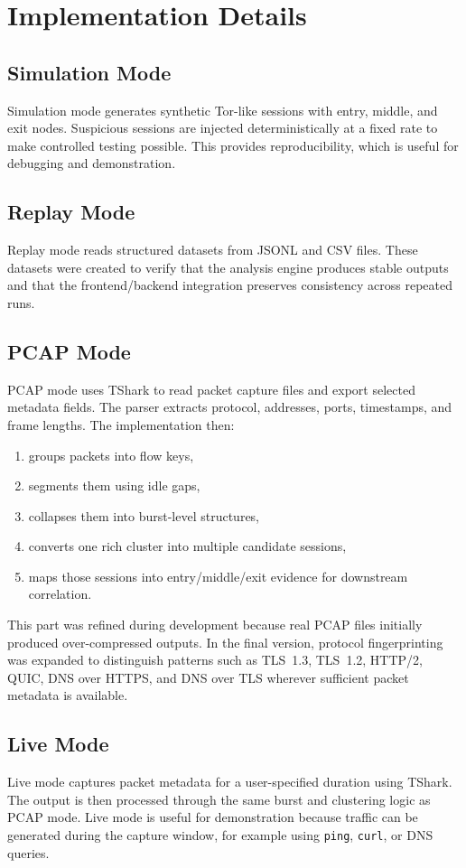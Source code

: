 \documentclass[12pt,a4paper]{report}
\begin{document}
\chapter{Implementation Details}
\section{Simulation Mode}
Simulation mode generates synthetic Tor-like sessions with entry, middle, and exit nodes. Suspicious sessions are injected deterministically at a fixed rate to make controlled testing possible. This provides reproducibility, which is useful for debugging and demonstration.

\section{Replay Mode}
Replay mode reads structured datasets from JSONL and CSV files. These datasets were created to verify that the analysis engine produces stable outputs and that the frontend/backend integration preserves consistency across repeated runs.

\section{PCAP Mode}
PCAP mode uses TShark to read packet capture files and export selected metadata fields. The parser extracts protocol, addresses, ports, timestamps, and frame lengths. The implementation then:
\begin{enumerate}[leftmargin=1.5em]
    \item groups packets into flow keys,
    \item segments them using idle gaps,
    \item collapses them into burst-level structures,
    \item converts one rich cluster into multiple candidate sessions,
    \item maps those sessions into entry/middle/exit evidence for downstream correlation.
\end{enumerate}
This part was refined during development because real PCAP files initially produced over-compressed outputs. In the final version, protocol fingerprinting was expanded to distinguish patterns such as TLS~1.3, TLS~1.2, HTTP/2, QUIC, DNS over HTTPS, and DNS over TLS wherever sufficient packet metadata is available.

\section{Live Mode}
Live mode captures packet metadata for a user-specified duration using TShark. The output is then processed through the same burst and clustering logic as PCAP mode. Live mode is useful for demonstration because traffic can be generated during the capture window, for example using \texttt{ping}, \texttt{curl}, or DNS queries.
\end{document}
